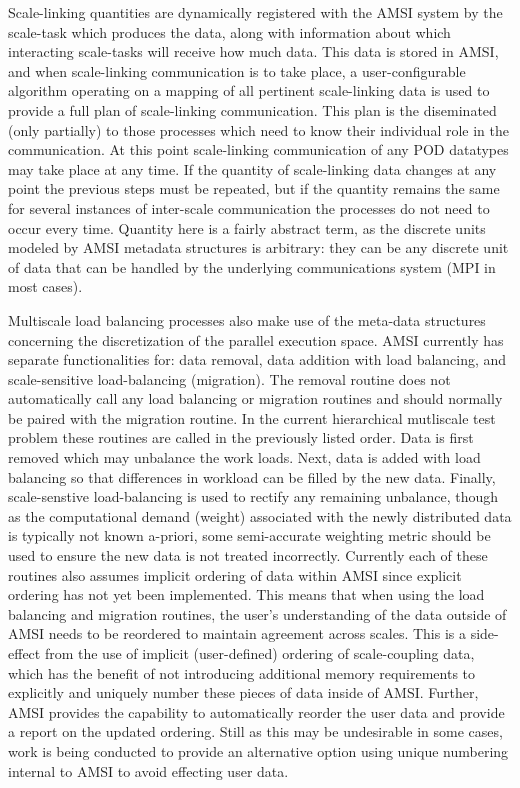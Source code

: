 Scale-linking quantities are dynamically registered with the AMSI system by the scale-task which produces the data, along with information about which interacting scale-tasks will receive how much data. This data is stored in AMSI, and when scale-linking communication is to take place, a user-configurable algorithm operating on a mapping of all pertinent scale-linking data is used to provide a full plan of scale-linking communication. This plan is the diseminated (only partially) to those processes which need to know their individual role in the communication. At this point scale-linking communication of any POD datatypes may take place at any time. If the quantity of scale-linking data changes at any point the previous steps must be repeated, but if the quantity remains the same for several instances of inter-scale communication the processes do not need to occur every time. Quantity here is a fairly abstract term, as the discrete units modeled by AMSI metadata structures is arbitrary: they can be any discrete unit of data that can be handled by the underlying communications system (MPI in most cases).

\label{amsi-load-balancing}
Multiscale load balancing processes also make use of the meta-data structures concerning the discretization of the parallel execution space. AMSI currently has separate functionalities for: data removal, data addition with load balancing, and scale-sensitive load-balancing (migration). The removal routine does not automatically call any load balancing or migration routines and should normally be paired with the migration routine. In the current hierarchical mutliscale test problem these routines are called in the previously listed order. Data is first removed which may unbalance the work loads. Next, data is added with load balancing so that differences in workload can be filled by the new data. Finally, scale-senstive load-balancing is used to rectify any remaining unbalance, though as the computational demand (weight) associated with the newly distributed data is typically not known a-priori, some semi-accurate weighting metric should be used to ensure the new data is not treated incorrectly. Currently each of these routines also assumes implicit ordering of data within AMSI since explicit ordering has not yet been implemented. This means that when using the load balancing and migration routines, the user's understanding of the data outside of AMSI needs to be reordered to maintain agreement across scales. This is a side-effect from the use of implicit (user-defined) ordering of scale-coupling data, which has the benefit of not introducing additional memory requirements to explicitly and uniquely number these pieces of data inside of AMSI. Further, AMSI provides the capability to automatically reorder the user data and provide a report on the updated ordering. Still as this may be undesirable in some cases, work is being conducted to provide an alternative option using unique numbering internal to AMSI to avoid effecting user data.


